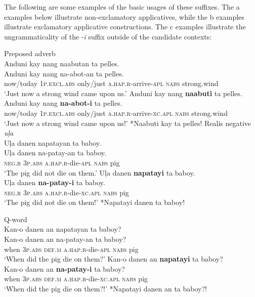 The following are some examples of the basic usages of these suffixes. The a examples below illustrate non-exclamatory applicatives, while the b examples illustrate exclamatory applicative constructions. The c examples illustrate the ungrammaticality of the -\textit{i} suffix outside of the candidate contexts:

\ea Preposed adverb \\
    \ea
    Anduni  kay  nang  naabutan  ta  pelles. \\\smallskip
 \gll Anduni  kay  nang  na-abot-an  ta  pelles. \\
    now/today  1\textsc{p.excl.abs}  only/just  \textsc{a.hap.r}-arrive-\textsc{apl}  \textsc{nabs}  strong.wind \\
    \glt ‘Just now a strong wind came upon us.’
    \newpage
    \ex
    Anduni  kay  nang  \textbf{naabuti}  ta  pelles. \\\smallskip
 \gll Anduni  kay  nang  \textbf{na-abot-i}  ta  pelles. \\
     now/today  1\textsc{p.excl.abs}  only/just  \textsc{a.hap.r}-arrive-\textsc{xc.apl}  \textsc{nabs}  strong.wind \\
    \glt ‘Just now a strong wind came upon us!’
    \ex
    *Naabuti kay ta pelles!
    \z
\z
\ea Realis negative \textit{uļa} \\
    \ea
    Uļa  danen  napatayan  ta  baboy. \\\smallskip
 \gll Uļa  danen  na-patay-an  ta  baboy. \\
    \textsc{neg.r}  3\textsc{p.abs}  \textsc{a.hap.r}-die-\textsc{apl}  \textsc{nabs}  pig \\
    \glt ‘The pig did not die on them.’
    \ex
    Uļa  danen  \textbf{napatayi}  ta  baboy. \\\smallskip
 \gll Uļa  danen  \textbf{na-patay-i}  ta  baboy. \\
    \textsc{neg.r}  3\textsc{p.abs}  \textsc{a.hap.r}-die-\textsc{xc.apl}  \textsc{nabs}  pig \\
    \glt ‘The pig did not die on them!'
    \ex
    *Napatayi danen ta baboy!
    \z
\z

\ea Q-word \\
    \ea
    Kan-o  danen  an  napatayan  ta  baboy? \\\smallskip
 \gll Kan-o  danen  an  na-patay-an  ta  baboy? \\
    when  3\textsc{p.abs}  \textsc{def.m} \textsc{a.hap.r}-die-\textsc{apl}  \textsc{nabs} pig \\
    \glt ‘When did the pig die on them?’
    \ex
    Kan-o  danen  an  \textbf{napatayi}  ta  baboy? \\\smallskip
 \gll Kan-o  danen  an  \textbf{na-patay-i}  ta  baboy? \\
    when  3\textsc{p.abs}  \textsc{def.m}  \textsc{a.hap.r}-die-\textsc{xc.apl}  \textsc{nabs}  pig \\
    \glt ‘When did the pig die on them?!’
    \ex
    *Napatayi danen an ta baboy?!
    \z
\z

